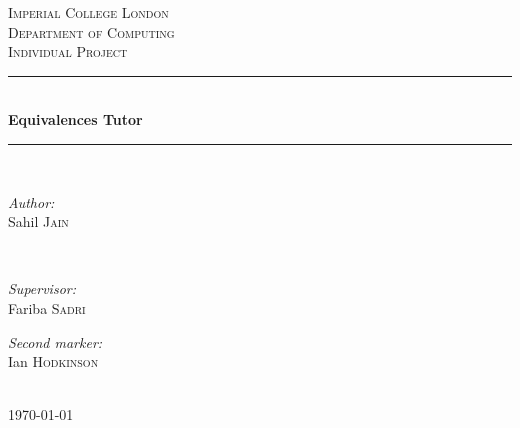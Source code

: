 \documentclass{report}
\begin{document}





\begin{titlepage}

\newcommand{\HRule}{\rule{\linewidth}{0.5mm}}

\center

\textsc{\LARGE Imperial College London} \\[0.5cm]

\textsc{\Large Department of Computing} \\[0.5cm]

\textsc{\large Individual Project} \\[1.5cm]

\HRule \\[0.3cm]

{\huge \bfseries Equivalences Tutor} \\[0.3cm]

\HRule \\[1.5cm]




\begin{minipage}{0.4\textwidth}

\begin{flushleft} \large \emph{Author:} \\

Sahil \textsc{Jain}

\end{flushleft}

\end{minipage}~

\begin{minipage}{0.4\textwidth}

\begin{flushright} \large \emph{Supervisor:} \\

Fariba \textsc{Sadri}

\end{flushright}

\begin{flushright} \large \emph{Second marker:} \\

Ian \textsc{Hodkinson}

\end{flushright}

\end{minipage}\\[4cm]

{\large \today}\\[3cm]

\vfill

\end{titlepage}
\end{document}
